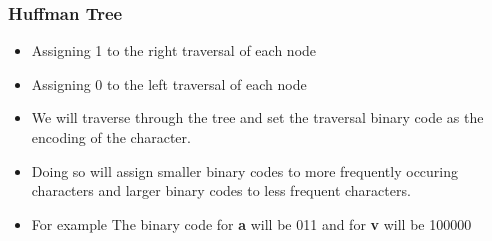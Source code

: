 \documentclass[10pt,aspectratio=43]{beamer}
\begin{document}
\begin{frame}
    \frametitle{\textcolor{myMaroon}{Huffman Tree}}
    \begin{itemize}
        \item Assigning 1 to the right traversal of each node
        
        \vspace{0.4cm}
        \item Assigning 0 to the left traversal of each node
        
        \vspace{0.4cm}
        \item We will traverse through the tree and set the traversal binary code as the encoding of the character.
        
        \vspace{0.4cm}
        \item Doing so will assign smaller binary codes to more frequently occuring characters and larger binary codes to less frequent characters.

        \vspace{0.4cm}
        \item For example The binary code for \textbf{a} will be 011 and for \textbf{v} will be 100000
    \end{itemize}

\end{frame}
\end{document}

